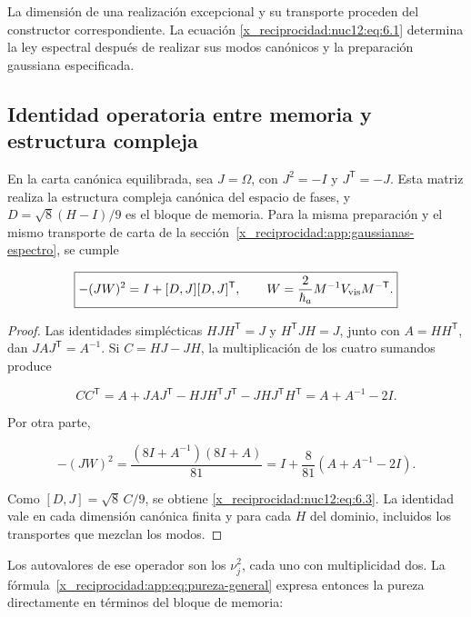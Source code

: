La dimensión de una realización excepcional y su transporte proceden del constructor correspondiente. La ecuación \eqref{x_reciprocidad:nuc12:eq:6.1} determina la ley espectral después de realizar sus modos canónicos y la preparación gaussiana especificada.

\subsection{Identidad operatoria entre memoria y estructura compleja}

En la carta canónica equilibrada, sea \(J=\Omega\), con \(J^2=-I\) y \(J^{\mathsf T}=-J\). Esta matriz realiza la estructura compleja canónica del espacio de fases, y \(D=\sqrt8(H-I)/9\) es el bloque de memoria. Para la misma preparación y el mismo transporte de carta de la sección~\ref{x_reciprocidad:app:gaussianas-espectro}, se cumple



\begin{equation}
\boxed{-(JW)^2=I+[D,J][D,J]^{\mathsf T},\qquad
W=\frac{2}{\hbar_a}M^{-1}V_{\rm vis}M^{-\mathsf T}.}
\label{x_reciprocidad:nuc12:eq:6.3}
\end{equation}



\begin{proof}
Las identidades simplécticas \(HJH^{\mathsf T}=J\) y \(H^{\mathsf T}JH=J\), junto con \(A=HH^{\mathsf T}\), dan \(JAJ^{\mathsf T}=A^{-1}\). Si \(C=HJ-JH\), la multiplicación de los cuatro sumandos produce



\[
CC^{\mathsf T}
=A+JAJ^{\mathsf T}
-HJH^{\mathsf T}J^{\mathsf T}
-JHJ^{\mathsf T}H^{\mathsf T}
=A+A^{-1}-2I.
\]



Por otra parte,



\[
-(JW)^2
=\frac{(8I+A^{-1})(8I+A)}{81}
=I+\frac8{81}(A+A^{-1}-2I).
\]



Como \([D,J]=\sqrt8\,C/9\), se obtiene \eqref{x_reciprocidad:nuc12:eq:6.3}. La identidad vale en cada dimensión canónica finita y para cada \(H\) del dominio, incluidos los transportes que mezclan los modos.
\end{proof}

Los autovalores de ese operador son los \(\nu_j^2\), cada uno con multiplicidad dos. La fórmula~\eqref{x_reciprocidad:app:eq:pureza-general} expresa entonces la pureza directamente en términos del bloque de memoria:



